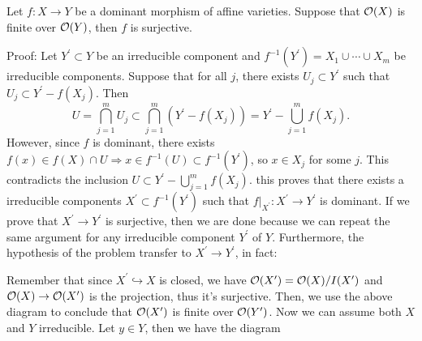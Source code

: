 \begin{dang}
\begin{lemma}
    Let $f:X\to Y$ be a dominant morphism of affine varieties. Suppose that 
    $\mathcal{O}(X)$ is finite over $\mathcal{O}(Y)$, then $f$ is surjective.
\end{lemma}
\end{dang}
Proof: Let $Y^\prime\subset Y$ be an irreducible component and 
$f^{-1}(Y^\prime)=X_1\cup\cdots\cup X_m$ be irreducible components. Suppose that 
for all $j$, there exists $U_j\subset Y^\prime$ such that $U_j\subset Y^\prime - f(X_j)$. Then 
\begin{equation}
    U=\bigcap_{j=1}^mU_j\subset \bigcap_{j=1}^m(Y^\prime - f(X_j))=Y^\prime - \bigcup_{j=1}^m f(X_j).
\end{equation}
However, since $f$ is dominant, there exists $f(x)\in f(X)\cap U\Rightarrow x\in f^{-1}(U)\subset f^{-1}(Y^\prime)$, so 
$x\in X_j$ for some $j$. This contradicts the inclusion $U\subset Y^\prime - \bigcup_{j=1}^mf(X_j)$. this proves that 
there exists a irreducible components $X^\prime\subset f^{-1}(Y^\prime)$ such that 
$f|_{X^\prime}:X^\prime\to Y^\prime$ is dominant. If we prove that $X^\prime \to Y^\prime$ is surjective, then we are done 
because we can repeat the same argument for any irreducible component $Y^\prime$ of $Y$. Furthermore, the hypothesis 
of the problem transfer to $X^\prime\to Y^\prime$, in fact:
\begin{center}
\end{center}
Remember that since $X^\prime\hookrightarrow X$ is closed, we have $\mathcal{O}(X^\prime)=\mathcal{O}(X)/I(X^\prime)$ and 
$\mathcal{O}(X)\to \mathcal{O}(X^\prime)$ is the projection, thus it's surjective. Then, we use the above diagram 
to conclude that $\mathcal{O}(X^\prime)$ is finite over $\mathcal{O}(Y^\prime)$. Now we can assume both $X$ and $Y$ irreducible. 
Let $y\in Y$, then we have the diagram 
\begin{center}
\end{center}
